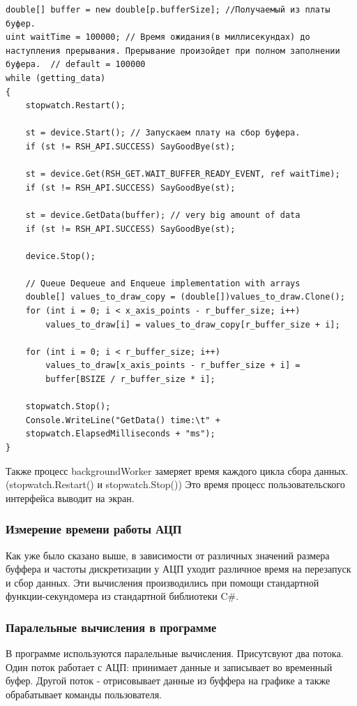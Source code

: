 \documentclass[../paper.tex]{subfiles}
\begin{document}
\begin{verbatim}
double[] buffer = new double[p.bufferSize]; //Получаемый из платы буфер.
uint waitTime = 100000; // Время ожидания(в миллисекундах) до 
наступления прерывания. Прерывание произойдет при полном заполнении
буфера.  // default = 100000
while (getting_data)
{
    stopwatch.Restart();

    st = device.Start(); // Запускаем плату на сбор буфера.
    if (st != RSH_API.SUCCESS) SayGoodBye(st);

    st = device.Get(RSH_GET.WAIT_BUFFER_READY_EVENT, ref waitTime);
    if (st != RSH_API.SUCCESS) SayGoodBye(st);

    st = device.GetData(buffer); // very big amount of data
    if (st != RSH_API.SUCCESS) SayGoodBye(st);

    device.Stop();

    // Queue Dequeue and Enqueue implementation with arrays
    double[] values_to_draw_copy = (double[])values_to_draw.Clone();
    for (int i = 0; i < x_axis_points - r_buffer_size; i++) 
        values_to_draw[i] = values_to_draw_copy[r_buffer_size + i];

    for (int i = 0; i < r_buffer_size; i++)
        values_to_draw[x_axis_points - r_buffer_size + i] = 
        buffer[BSIZE / r_buffer_size * i];

    stopwatch.Stop();
    Console.WriteLine("GetData() time:\t" + 
    stopwatch.ElapsedMilliseconds + "ms");
} 
\end{verbatim}

Также процесс backgroundWorker замеряет время каждого цикла сбора данных. (stopwatch.Restart() и stopwatch.Stop()) Это время процесс пользовательского интерфейса выводит на экран.

\subsubsection{Измерение времени работы АЦП}
Как уже было сказано выше, в зависимости от различных значений размера буффера и частоты дискретизации у АЦП уходит различное время на перезапуск и сбор данных. Эти вычисления производились при помощи стандартной функции-секундомера из стандартной библиотеки C\#.

\subsubsection{Паралельные вычисления в программе}
В программе используются паралельные вычисления. Присутсвуют два потока. Один поток работает с АЦП: принимает данные и записывает во временный буфер. Другой поток - отрисовывает данные из буффера на графике а также обрабатывает команды пользователя. 
\end{document}
